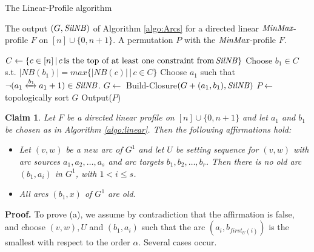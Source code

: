 \documentclass{article}
\newcommand{\M}{\mbox{\it MinMax}}
\newcommand{\n}{[n]}
\newcommand{\lrf}[1]{\xleftrightarrow{#1}}
\newcommand{\Sil}{{\it SilNB}}
\newtheorem{fait}{Claim}
\newcommand{\bfn}{\begin{fait}}
\newcommand{\efn}{\end{fait}}
\begin{document}
\begin{algorithm}[t,boxed]
\caption{The Linear-Profile algorithm}
\begin{algorithmic}[1]
\REQUIRE The output $(G, \Sil)$ of Algorithm \ref{algo:Arcs} for a directed linear $\M$-profile $F$ on $[n]\cup\{0,n+1\}$. 
\ENSURE  A permutation $P$ with the $\M$-profile $F$.

\WHILE{$\Sil\neq\emptyset$}
\STATE $C\leftarrow\{c\in\n\, |\, c\, \mbox{is the top of at least one constraint from}\, \Sil\}$
\STATE Choose $b_1\in C$ s.t. $|NB(b_1)|=max\{|NB(c)|\, |\, c\in C\}$
\STATE Choose $a_1$ such that $\neg(a_1\lrf{b_1}a_1+1)\in \Sil$. 
\STATE $G\leftarrow$ Build-Closure$(G+(a_1,b_1),\Sil)$
\ENDWHILE
\STATE $P\leftarrow$ topologically sort $G$
\STATE Output($P$)
\end{algorithmic}
\label{algo:linear}
\end{algorithm}

\bfn
Let $F$ be a directed linear profile on  $[n]\cup\{0,n+1\}$ and
let  $a_1$ and $b_1$ be chosen as in  Algorithm \ref{algo:linear}. Then the following
affirmations hold:

\begin{itemize}

\item[$(a)$] Let $(v,w)$ be a new arc of $G^1$ and let $U$ be setting sequence 
for $(v,w)$ with arc sources  $a_1, a_2, \ldots, a_s$ and arc targets $b_1, b_2, \ldots, b_r$.
Then there is no old arc $(b_1,a_i)$ in $G^1$, with $1< i\leq s$.
\item[$(b)$] All arcs $(b_1,x)$ of $G^1$ are old.
\end{itemize}
\label{claim:before5}
\efn


{\bf Proof.} To prove (a), we assume by contradiction that the affirmation is false,
and choose $(v,w), U$ and $(b_1,a_i)$ such that the arc $(a_i,b_{first_U(i)})$ is the smallest 
with respect to the order $\alpha$. Several cases occur.
\end{document}
